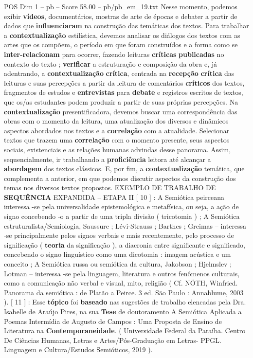 \begin{textsample}{POS Dim 1 – pb – Score 58.00 – pb/pb\_em\_19.txt}
Nesse momento, podemos exibir \textbf{vídeos}, documentários, mostras de arte de épocas e debater a partir de dados que \textbf{influenciaram} na construção das temáticas dos textos.
Para trabalhar a \textbf{contextualização} estilística, devemos analisar os diálogos dos textos com as artes que os compõem, o período em que foram construídos e a forma como se \textbf{inter-relacionam} para ocorrer, fazendo leituras \textbf{críticas} \textbf{publicadas} no contexto do texto ; \textbf{verificar} a estruturação e composição da obra e, já adentrando, a \textbf{contextualização} \textbf{crítica}, centrada na \textbf{recepção} \textbf{crítica} das leituras e suas percepções a partir da leitura de comentários \textbf{críticos} dos textos, fragmentos de estudos e \textbf{entrevistas} para \textbf{debate} e registros escritos de textos, que os/as estudantes podem produzir a partir de suas próprias percepções.
Na \textbf{contextualização} presentificadora, devemos buscar uma correspondência das obras com o momento da leitura, uma atualização dos diversos e dinâmicos aspectos abordados nos textos e a \textbf{correlação} com a atualidade.
Selecionar textos que trazem uma \textbf{correlação} com o momento presente, seus aspectos sociais, existenciais e as relações humanas advindas desse panorama.
Assim, sequencialmente, ir trabalhando a \textbf{proficiência} leitora até alcançar a \textbf{abordagem} dos textos clássicos.
E, por fim, a \textbf{contextualização} temática, que complementa a anterior, em que podemos discutir aspectos da construção dos temas nos diversos textos propostos.
EXEMPLO DE TRABALHO DE \textbf{SEQUÊNCIA} EXPANDIDA – ETAPA II [ 10 ] : A Semiótica peirceana interessa -se pela universalidade epistemológica e metafísica, ou seja, a ação de signo concebendo -o a partir de uma tripla divisão ( tricotomia ) ; A Semiótica estruturalista/Semiologia, Saussure ; Lévi-Strauss ; Barthes ; Greimas – interessa -se principalmente pelos signos verbais e mais recentemente, pelo processo de significação ( \textbf{teoria} da significação ), a diacronia entre significante e significado, concebendo o signo linguístico como uma dicotomia : imagem acústica e um conceito ; A Semiótica russa ou semiótica da cultura, Jakobson ; Hjelmslev ; Lotman – interessa -se pela linguagem, literatura e outros fenômenos culturais, como a comunicação não verbal e visual, mito, religião ( Cf.
NÖTH, Winfried.
Panorama da semiótica : de Platão a Peirce. 3 ed.
São Paulo : Annablume, 2003 ). [ 11 ] : Esse \textbf{tópico} foi \textbf{baseado} nas sugestões de trabalho elencadas pela Dra.
Isabelle de Araújo Pires, na sua \textbf{Tese} de doutoramento A Semiótica Aplicada a Poemas Intermídia de Augusto de Campos : Uma Proposta de Ensino de Literatura na \textbf{Contemporaneidade}. ( Universidade Federal da Paraíba.
Centro De Ciências Humanas, Letras e Artes/Pós-Graduação em Letras- PPGL.
Linguagem e Cultura/Estudos Semióticos, 2019 ).


\end{textsample}
